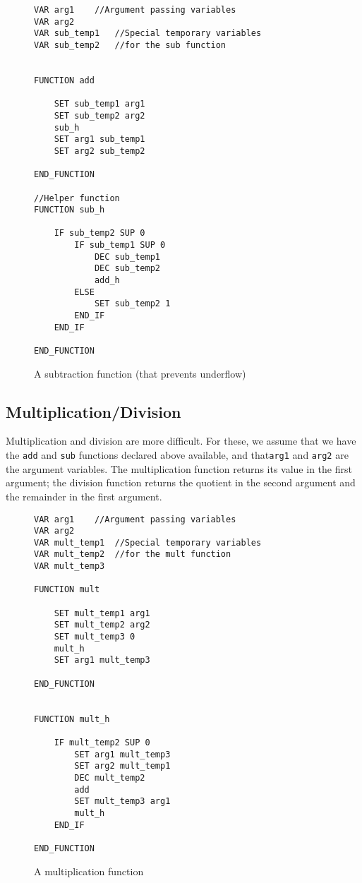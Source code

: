 \documentclass[12pt,a4paper]{scrbook}
\begin{document}
\begin{figure}[h]
\begin{lstlisting}
VAR arg1	//Argument passing variables
VAR arg2
VAR sub_temp1	//Special temporary variables
VAR sub_temp2	//for the sub function


FUNCTION add

	SET sub_temp1 arg1
	SET sub_temp2 arg2
	sub_h
	SET arg1 sub_temp1
	SET arg2 sub_temp2
	
END_FUNCTION

//Helper function
FUNCTION sub_h

	IF sub_temp2 SUP 0
		IF sub_temp1 SUP 0
			DEC sub_temp1
			DEC sub_temp2
			add_h
		ELSE
			SET sub_temp2 1
		END_IF
	END_IF
	
END_FUNCTION
\end{lstlisting}
\caption{A subtraction function (that prevents underflow)} 
\end{figure}

\subsection{Multiplication/Division}
Multiplication and division are more difficult.  For these, we assume that we have the \texttt{add}
and \texttt{sub} functions declared above available, and that\texttt{arg1} and \texttt{arg2} are
the argument variables.  The multiplication function returns its value in the first argument; the
division function returns the quotient in the second argument and the remainder in the first 
argument.

\begin{figure}[h]
\begin{lstlisting}
VAR arg1	//Argument passing variables
VAR arg2
VAR mult_temp1	//Special temporary variables
VAR mult_temp2	//for the mult function
VAR mult_temp3

FUNCTION mult

	SET mult_temp1 arg1
	SET mult_temp2 arg2
	SET mult_temp3 0
	mult_h
	SET arg1 mult_temp3
	
END_FUNCTION
	
	
FUNCTION mult_h

	IF mult_temp2 SUP 0
		SET arg1 mult_temp3
		SET arg2 mult_temp1
		DEC mult_temp2
		add
		SET mult_temp3 arg1
		mult_h
	END_IF
	
END_FUNCTION
\end{lstlisting}
\caption{A multiplication function} 
\end{figure}
\end{document}
